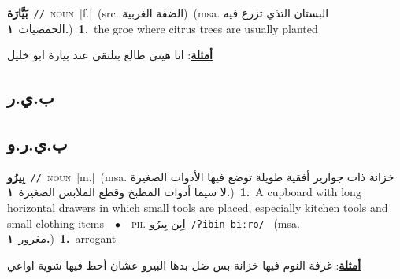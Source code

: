 \documentclass[10pt,a4paper,twoside]{article} %
\begin{document}
\begin{multicols}{2}
{\setlength\topsep{0pt}\textbf{\foreignlanguage{arabic}{بَيَّارَة}}\ {\color{gray}\texttt{//}\color{black}}\ \textsc{noun}\ [f.]\ (src. \color{gray}\foreignlanguage{arabic}{الضفة الغربية}\color{black})\ \color{gray}(msa. \foreignlanguage{arabic}{البستان التذي تزرع فيه الحمضيات}~\foreignlanguage{arabic}{\textbf{١.}})\color{black}\ \textbf{1.}~the groe where citrus trees are usually planted\  \begin{flushright}\color{gray}\foreignlanguage{arabic}{\textbf{\underline{\foreignlanguage{arabic}{أمثلة}}}: انا هيني طالع بنلتقي عند بيارة ابو خليل}\end{flushright}\color{black}} \vspace{2mm}

\vspace{-3mm}
\subsection*{\color{blue}\foreignlanguage{arabic}{ب.ي.ر}\color{blue}{ (ntws)}} 

\vspace{-3mm}
\subsection*{\color{blue}\foreignlanguage{arabic}{ب.ي.ر.و}\color{blue}{ (ntws)}} 

{\setlength\topsep{0pt}\textbf{\foreignlanguage{arabic}{بِيرُو}}\ {\color{gray}\texttt{//}\color{black}}\ \textsc{noun}\ [m.]\ \color{gray}(msa. \foreignlanguage{arabic}{خزانة ذات جوارير أفقية طويلة توضع فيها الأدوات الصغيرة لا سيما أدوات المطبخ وقطع الملابس الصغيرة}~\foreignlanguage{arabic}{\textbf{١.}})\color{black}\ \textbf{1.}~A cupboard with long horizontal drawers in which small tools are placed, especially kitchen tools and small clothing items\ \ $\bullet$\ \ \textsc{ph.} \color{gray} \foreignlanguage{arabic}{اِبِن بِيرُو}\color{black}\ {\color{gray}\texttt{/{\sffamily ʔibin biːro}/}\color{black}}\ \color{gray} (msa. \foreignlanguage{arabic}{مغرور}~\foreignlanguage{arabic}{\textbf{١.}})\color{black}\ \textbf{1.}~arrogant\  \begin{flushright}\color{gray}\foreignlanguage{arabic}{\textbf{\underline{\foreignlanguage{arabic}{أمثلة}}}: غرفة النوم فيها خزانة بس ضل بدها البيرو عشان أحط فيها شوية اواعي}\end{flushright}\color{black}} \vspace{2mm}


\end{multicols}
\end{document}
